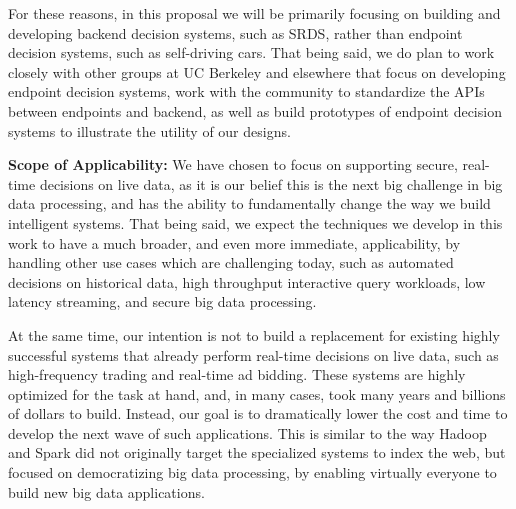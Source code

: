 For these reasons, in this proposal we will be primarily focusing on building and developing backend decision systems, such as SRDS, rather than endpoint decision systems, such as self-driving cars. That being said, we do plan to work closely with other groups at UC Berkeley and elsewhere that focus on developing endpoint decision systems, work with the community to standardize the APIs between endpoints and backend, as well as build prototypes of endpoint decision systems to illustrate the utility of our designs.  


{\bf Scope of Applicability:} We have chosen to focus on supporting secure, real-time decisions on live data, as it is our belief this is the next big challenge in big data processing, and has the ability to fundamentally change the way we build intelligent systems. That being said, we expect the techniques we develop in this work to have a much broader, and even more immediate, applicability, by handling other use cases which are challenging today, such as automated decisions on historical data, high throughput interactive query workloads, low latency streaming, and secure big data processing.

At the same time, our intention is not to build a replacement for existing highly successful systems that already perform real-time decisions on live data, such as high-frequency trading and real-time ad bidding. These systems are highly optimized for the task at hand, and, in many cases, took many years and billions of dollars to build. Instead, our goal is to dramatically lower the cost and time to develop the next wave of such applications. This is similar to the way Hadoop and Spark did not originally target the specialized systems to index the web, but focused on democratizing big data processing, by enabling virtually everyone to build new big data applications.
